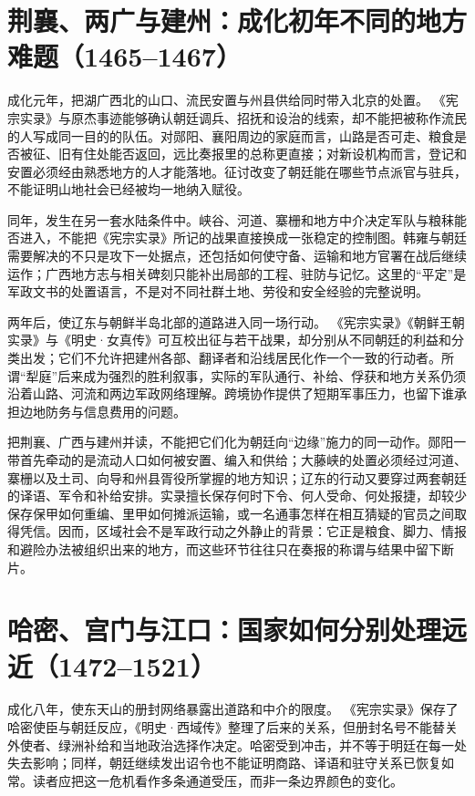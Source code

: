 \section{荆襄、两广与建州：成化初年不同的地方难题（1465--1467）}

成化元年，把湖广西北的山口、流民安置与州县供给同时带入北京的处置。 《宪宗实录》与原杰事迹能够确认朝廷调兵、招抚和设治的线索，却不能把被称作流民的人写成同一目的的队伍。对郧阳、襄阳周边的家庭而言，山路是否可走、粮食是否被征、旧有住处能否返回，远比奏报里的总称更直接；对新设机构而言，登记和安置必须经由熟悉地方的人才能落地。征讨改变了朝廷能在哪些节点派官与驻兵，不能证明山地社会已经被均一地纳入赋役。

同年，发生在另一套水陆条件中。峡谷、河道、寨栅和地方中介决定军队与粮秣能否进入，不能把《宪宗实录》所记的战果直接换成一张稳定的控制图。韩雍与朝廷需要解决的不只是攻下一处据点，还包括如何使守备、运输和地方官署在战后继续运作；广西地方志与相关碑刻只能补出局部的工程、驻防与记忆。这里的“平定”是军政文书的处置语言，不是对不同社群土地、劳役和安全经验的完整说明。

两年后，使辽东与朝鲜半岛北部的道路进入同一场行动。 《宪宗实录》《朝鲜王朝实录》与《明史·女真传》可互校出征与若干战果，却分别从不同朝廷的利益和分类出发；它们不允许把建州各部、翻译者和沿线居民化作一个一致的行动者。所谓“犁庭”后来成为强烈的胜利叙事，实际的军队通行、补给、俘获和地方关系仍须沿着山路、河流和两边军政网络理解。跨境协作提供了短期军事压力，也留下谁承担边地防务与信息费用的问题。

把荆襄、广西与建州并读，不能把它们化为朝廷向“边缘”施力的同一动作。郧阳一带首先牵动的是流动人口如何被安置、编入和供给；大藤峡的处置必须经过河道、寨栅以及土司、向导和州县胥役所掌握的地方知识；辽东的行动又要穿过两套朝廷的译语、军令和补给安排。实录擅长保存何时下令、何人受命、何处报捷，却较少保存保甲如何重编、里甲如何摊派运输，或一名通事怎样在相互猜疑的官员之间取得凭信。因而，区域社会不是军政行动之外静止的背景：它正是粮食、脚力、情报和避险办法被组织出来的地方，而这些环节往往只在奏报的称谓与结果中留下断片。

\section{哈密、宫门与江口：国家如何分别处理远近（1472--1521）}

成化八年，使东天山的册封网络暴露出道路和中介的限度。 《宪宗实录》保存了哈密使臣与朝廷反应，《明史·西域传》整理了后来的关系，但册封名号不能替关外使者、绿洲补给和当地政治选择作决定。哈密受到冲击，并不等于明廷在每一处失去影响；同样，朝廷继续发出诏令也不能证明商路、译语和驻守关系已恢复如常。读者应把这一危机看作多条通道受压，而非一条边界颜色的变化。

